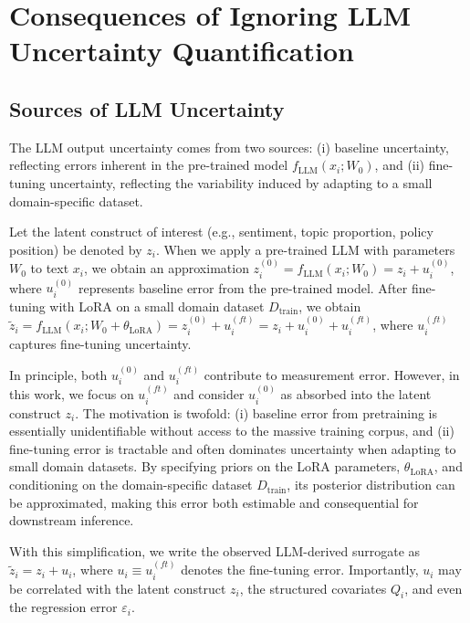 \documentclass[11pt]{article}
\begin{document}
\newpage
\appendix

\section{Consequences of Ignoring LLM Uncertainty Quantification}
\label{appendix:llm_inference}

\subsection{Sources of LLM Uncertainty}
The LLM output uncertainty comes from two sources: (i) baseline uncertainty, reflecting errors inherent in the pre-trained model $f_{\text{LLM}}(x_i; W_0)$, 
and (ii) fine-tuning uncertainty,
reflecting the variability induced by adapting to a small domain-specific dataset.

Let the latent construct of interest (e.g., sentiment, topic proportion, policy position) be denoted by $z_i$. When we apply a pre-trained LLM with parameters $W_0$ to text $x_i$, we obtain an approximation $z_i^{(0)} = f_{\text{LLM}}(x_i; W_0) = z_i + u_i^{(0)}$, where $u_i^{(0)}$ represents baseline error from the pre-trained model. After fine-tuning with LoRA on a small domain dataset $D_{\text{train}}$, we obtain $\tilde{z}_i = f_{\text{LLM}}(x_i; W_0 + \theta_{\text{LoRA}}) = z_i^{(0)} + u_i^{(ft)} = z_i + u_i^{(0)} + u_i^{(ft)}$, where $u_i^{(ft)}$ captures fine-tuning uncertainty.

In principle, both $u_i^{(0)}$ and $u_i^{(ft)}$ contribute to measurement error. However, in this work, we focus on $u_i^{(ft)}$ and consider $u_i^{(0)}$ as absorbed into the latent construct $z_i$. The motivation is twofold: (i) baseline error from pretraining is essentially unidentifiable without access to the massive training corpus, and (ii) fine-tuning error is tractable and often dominates uncertainty when adapting to small domain datasets. By specifying priors on the LoRA parameters, $\theta_{\text{LoRA}}$, and conditioning on the domain-specific dataset $D_{\text{train}}$, its posterior distribution can be approximated, making this error both estimable and consequential for downstream inference.

With this simplification, we write the observed LLM-derived surrogate as $\tilde{z}_i = z_i + u_i$, where $u_i \equiv u_i^{(ft)}$ denotes the fine-tuning error. 
Importantly, $u_i$ may be correlated with the latent construct $z_i$, the structured covariates $Q_i$, and even the regression error $\varepsilon_i$.
\end{document}
